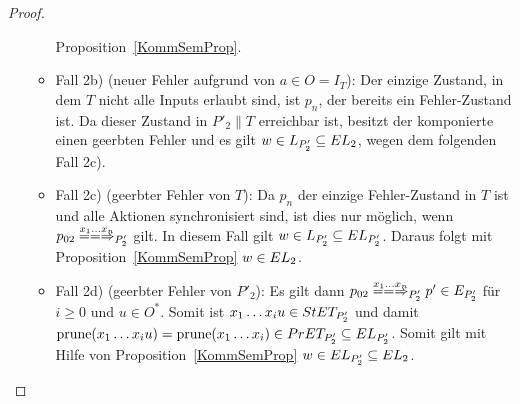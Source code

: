\begin{proof}
\begin{itemize}
\begin{itemize}
          Proposition~\ref{KommSemProp}.
        \item Fall 2b) (neuer Fehler aufgrund von $a\in O=I_T$): Der einzige
          Zustand, in dem $T$ nicht alle Inputs erlaubt sind, ist $p_n$, der
          bereits ein Fehler-Zustand ist. Da dieser Zustand in $P'_2\|T$
          erreichbar ist, besitzt der komponierte \MEIO{} einen geerbten Fehler
          und es gilt $w\in L_{P'_2}\subseteq EL _2$, wegen dem folgenden Fall
          2c).
        \item Fall 2c) (geerbter Fehler von $T$): Da $p_n$ der einzige
          Fehler-Zustand in $T$ ist und alle Aktionen synchronisiert sind, ist
          dies nur möglich, wenn $p_{02} \lweakmay[x_1\dots x_n]_{P'_2}$ gilt.
          In diesem Fall gilt $w\in L_{P'_2}\subseteq EL _{P'_2}$. Daraus
          folgt mit Proposition~\ref{KommSemProp} $w\in EL _2$.
        \item Fall 2d) (geerbter Fehler von $P'_2$): Es gilt dann $p_{02}
          \lweakmay[x_1\dots x_n]_{P'_2} p'\in E_{P'_2}$ für $i\geq 0$ und
          $u\in O^*$. Somit ist $x_1\dots x_i u\in StET _{P'_2}$ und damit
          $\mathrm{prune} (x_1\dots x_iu) =\mathrm{prune} (x_1\dots x_i)\in PrET
          _{P'_2}\subseteq EL _{P'_2}$. Somit gilt mit Hilfe von
          Proposition~\ref{KommSemProp} $w\in EL _{P'_2}\subseteq EL _2$.
      \end{itemize}
  \end{itemize}
\end{proof}

